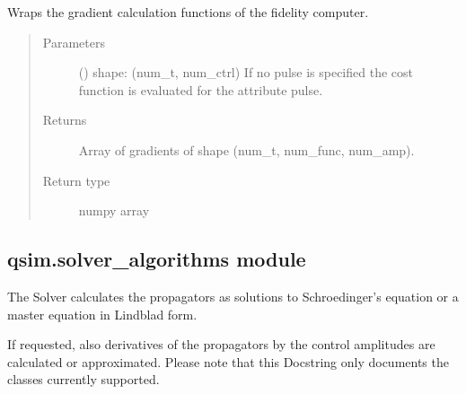 \documentclass[letterpaper,10pt,english]{sphinxmanual}
\begin{document}
\begin{fulllineitems}
\begin{fulllineitems}
\label{\detokenize{qsim:qsim.simulator.Simulator.wrapped_jac_function}}
Wraps the gradient calculation functions of the fidelity computer.
\begin{quote}\begin{description}
\item[{Parameters}] \leavevmode
{} (\sphinxstyleliteralemphasis{\sphinxupquote{, }}) \textendash{} shape: (num\_t, num\_ctrl) If no pulse is specified the cost function
is evaluated for the attribute pulse.

\item[{Returns}] \leavevmode
{} \textendash{} Array of gradients of shape (num\_t, num\_func, num\_amp).

\item[{Return type}] \leavevmode
numpy array

\end{description}\end{quote}

\end{fulllineitems}


\end{fulllineitems}



\subsection{qsim.solver\_algorithms module}
\label{\detokenize{qsim:module-qsim.solver_algorithms}}\label{\detokenize{qsim:qsim-solver-algorithms-module}}
The Solver calculates the propagators as solutions to Schroedinger’s
equation or a master equation in Lindblad form.

If requested, also derivatives of the propagators by the control amplitudes are
calculated or approximated. Please note that this Docstring only documents the
classes currently supported.
\end{document}
